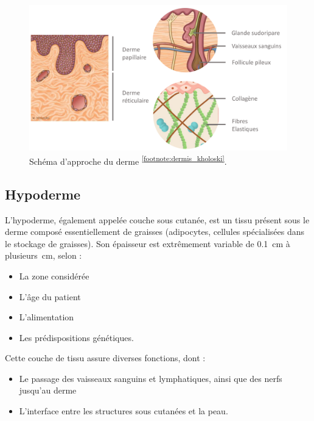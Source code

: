 \begin{figure}[H]
    \centering
    \includegraphics[width=\linewidth]{contents/chapter_1/resources/dermis_kholoski.pdf}
    \caption{Schéma d’approche du derme \textsuperscript{\ref{footnote:dermis_kholoski}}.}
    \label{fig:dermis_kholoski}
\end{figure}\par

\addtocounter{footnote}{1}
\clearpage

\subsection{Hypoderme}
L’hypoderme, également appelée couche sous cutanée, est un tissu présent sous le derme composé essentiellement de graisses (adipocytes, cellules spécialisées dans le stockage de graisses). Son épaisseur est extrêmement variable de \SI{0,1}{\centi\metre} à \SI[parse-numbers = false]{plusieurs}{\centi\metre}, selon :
\begin{itemize}
\item La zone considérée
\item L’âge du patient
\item L’alimentation
\item Les prédispositions génétiques.
\end{itemize}\par

Cette couche de tissu assure diverses fonctions, dont :
\begin{itemize}
\item Le passage des vaisseaux sanguins et lymphatiques, ainsi que des nerfs jusqu’au derme
\item L’interface entre les structures sous cutanées et la peau.
\end{itemize}\par

